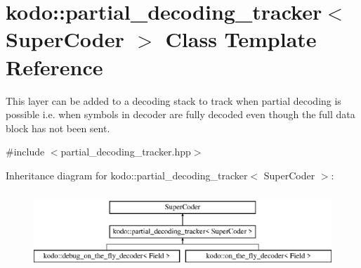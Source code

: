 \hypertarget{classkodo_1_1partial__decoding__tracker}{\section{kodo\-:\-:partial\-\_\-decoding\-\_\-tracker$<$ Super\-Coder $>$ Class Template Reference}
\label{classkodo_1_1partial__decoding__tracker}
}


This layer can be added to a decoding stack to track when partial decoding is possible i.\-e. when symbols in decoder are fully decoded even though the full data block has not been sent.  




{\ttfamily \#include $<$partial\-\_\-decoding\-\_\-tracker.\-hpp$>$}

Inheritance diagram for kodo\-:\-:partial\-\_\-decoding\-\_\-tracker$<$ Super\-Coder $>$\-:\begin{figure}[H]
\begin{center}
\leavevmode
\includegraphics[height=2.926829cm]{classkodo_1_1partial__decoding__tracker}
\end{center}
\end{figure}
